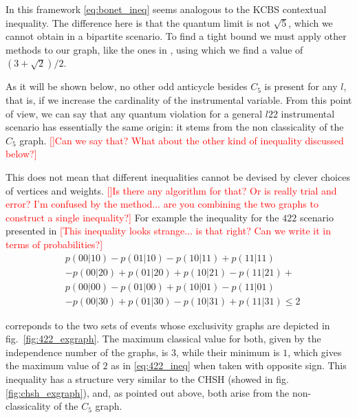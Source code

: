 \documentclass[letterpaper]{article}
\newcommand{\avg}[1]{\langle#1\rangle}
\begin{document}
In this framework \eqref{eq:bonet_ineq} seems analogous to the KCBS contextual
inequality\cite{kcbs2008}.
The difference here is that the quantum limit is not $\sqrt{5}$, which we cannot
obtain in a bipartite scenario.
To find a tight bound we must apply other methods to our graph, like the ones in
\cite{rabelo2014}, using which we find a value of $(3+\sqrt{2})/2$.

As it will be shown below, no other odd anticycle besides
$C_5$ is present for any $l$, that is, if we increase the cardinality of the instrumental variable. From this point of view, we can say that any quantum violation for a general $l22$ instrumental scenario has essentially the
same origin: it stems from the non classicality of the $C_5$ graph. \textcolor{red}{[]Can we say that? What about the other kind of inequality discussed below?]}

This does not mean that different inequalities cannot be devised by clever choices of vertices and weights. \textcolor{red}{[]Is there any algorithm for that? Or is really trial and error? I'm confused by the method... are you combining the two graphs to construct a single inequality?]}
For example the inequality for the $422$ scenario presented in \textcolor{red}{[This inequality looks strange... is that right? Can we write it in terms of probabilities?]}
\begin{align*}
&p(00|10)-p(01|10)-p(10|11)+p(11|11)\\
&-p(00|20)+p(01|20)+p(10|21)-p(11|21)+\\
&p(00|00)-p(01|00)+p(10|01)-p(11|01)\\
&-p(00|30)+p(01|30)-p(10|31)+p(11|31) \le 2
\end{align*}


correponds to the two sets of events whose
exclusivity graphs are depicted in fig.~\ref{fig:422_exgraph}.
The maximum classical value for both, given by the independence number of the
graphs, is $3$, while their minimum is $1$, which gives the maximum value of $2$
as in \eqref{eq:422_ineq} when taken with opposite sign.
This inequality has a structure very similar to the CHSH (showed in
fig.\ref{fig:chsh_exgraph}), and, as pointed out above, both arise from the
non-classicality of the $C_5$ graph.
\end{document}
